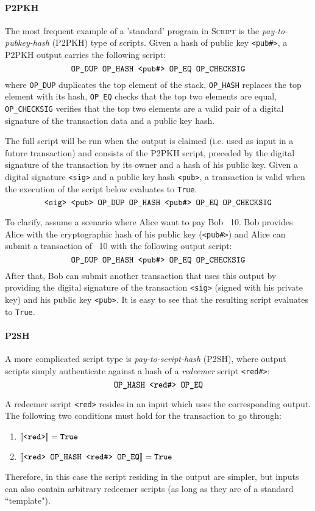\documentclass[acmsmall,nonacm=true,screen=true]{acmart}
\begin{document}
\newcommand\ttt{\texttt}
\newcommand\stack[1]{\text{\ttt{#1}}}
\newcommand\Semantics[1]{\llbracket \stack{#1} \rrbracket}

\paragraph{P2PKH}
The most frequent example of a 'standard' program in \textsc{Script} is the
\textit{pay-to-pubkey-hash} (P2PKH) type of scripts. Given a hash of public key \texttt{<pub\#>},
a P2PKH output carries the following script:
\[
  \stack{OP\_DUP OP\_HASH <pub\#> OP\_EQ OP\_CHECKSIG}
\]
where \ttt{OP\_DUP} duplicates the top element of the stack, \ttt{OP\_HASH} replaces the top element with its hash,
\ttt{OP\_EQ} checks that the top two elements are equal, \ttt{OP\_CHECKSIG} verifies that the top two elements
are a valid pair of a digital signature of the transaction data and a public key hash.

The full script will be run when the output is claimed (i.e. used as input in a future transaction)
and consists of the P2PKH script, preceded by the digital signature of the transaction by its owner and a hash of
his public key. Given a digital signature \ttt{<sig>} and a public key hash \ttt{<pub>}, a transaction is valid
when the execution of the script below evaluates to \ttt{True}.
\[
  \stack{<sig> <pub> OP\_DUP OP\_HASH <pub\#> OP\_EQ OP\_CHECKSIG}
\]

To clarify, assume a scenario where Alice want to pay Bob \bitcoin ~10.
Bob provides Alice with the cryptographic hash of his public key (\ttt{<pub\#>})
and Alice can submit a transaction of \bitcoin ~10 with the following output script:
\[
  \stack{OP\_DUP OP\_HASH <pub\#> OP\_EQ OP\_CHECKSIG}
\]
After that, Bob can submit another transaction that uses this output by providing the digital signature
of the transaction \ttt{<sig>} (signed with his private key) and his public key \ttt{<pub>}.
It is easy to see that the resulting script evaluates to \ttt{True}.

\paragraph{P2SH}
A more complicated script type is \textit{pay-to-script-hash} (P2SH), where output scripts simply authenticate
against a hash of a \textit{redeemer} script \ttt{<red\#>}:
\[
  \stack{OP\_HASH <red\#> OP\_EQ}
\]

A redeemer script \ttt{<red>} resides in an input which uses the corresponding output. The following two conditions
must hold for the transaction to go through:
\begin{enumerate}
\item $\Semantics{<red>} = \stack{True}$
\item $\Semantics{<red> OP\_HASH <red\#> OP\_EQ} = \stack{True}$
\end{enumerate}
Therefore, in this case the script residing in the output are simpler, but inputs can also contain arbitrary redeemer scripts
(as long as they are of a standard ``template").
\end{document}

